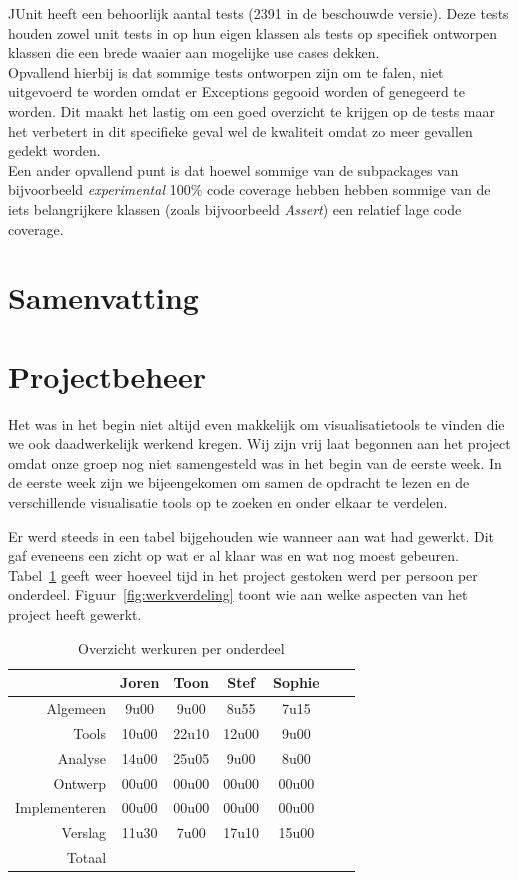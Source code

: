 \documentclass[i1]{oss}
\begin{document}
JUnit heeft een behoorlijk aantal tests (2391 in de beschouwde versie). Deze tests houden zowel unit tests in op hun eigen klassen als tests op specifiek ontworpen klassen die een brede waaier aan mogelijke use cases dekken.
\\
Opvallend hierbij is dat sommige tests ontworpen zijn om te falen, niet uitgevoerd te worden omdat er Exceptions gegooid worden of genegeerd te worden. Dit maakt het lastig om een goed overzicht te krijgen op de tests maar het verbetert in dit specifieke geval wel de kwaliteit omdat zo meer gevallen gedekt worden.
\\
Een ander opvallend punt is dat hoewel sommige van de subpackages van bijvoorbeeld \emph{experimental} 100\% code coverage hebben hebben sommige van de iets belangrijkere klassen (zoals bijvoorbeeld \emph{Assert}) een relatief lage code coverage.

\section{Samenvatting}

\section{Projectbeheer}

Het was in het begin niet altijd even makkelijk om visualisatietools te vinden die we ook daadwerkelijk werkend kregen.
Wij zijn vrij laat begonnen aan het project omdat onze groep nog niet samengesteld was in het begin van de eerste week. In de eerste week zijn we bijeengekomen om samen de opdracht te lezen en de verschillende visualisatie tools op te zoeken en onder elkaar te verdelen. 

Er werd steeds in een tabel bijgehouden wie wanneer aan wat had gewerkt. Dit gaf eveneens een zicht op wat er al klaar was en wat nog moest gebeuren. \\
Tabel~\ref{tab:werkuren} geeft weer hoeveel tijd in het project gestoken werd per persoon per onderdeel. Figuur~\ref{fig:werkverdeling} toont wie aan welke aspecten van het project heeft gewerkt.

\begin{table}[h]
\begin{center}
    \begin{tabular}{ r | c  c  c  c  c  c}
     & Joren & Toon & Stef & Sophie \\ \hline
    Algemeen & 9u00 & 9u00 & 8u55 & 7u15\\
   	Tools & 10u00 & 22u10 & 12u00 & 9u00 \\
	Analyse & 14u00 & 25u05 & 9u00 & 8u00 \\
	Ontwerp & 00u00 & 00u00 & 00u00 & 00u00 \\
	Implementeren & 00u00 & 00u00 & 00u00 & 00u00\\
	Verslag & 11u30 & 7u00 & 17u10 & 15u00 \\
	Totaal & & & & 
    \end{tabular}
    \caption{Overzicht werkuren per onderdeel}
    \label{tab:werkuren}
\end{center}
\end{table}
\end{document}
